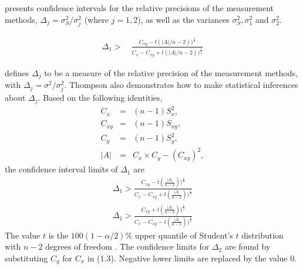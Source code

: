 \documentclass[12pt, a4paper]{report}
\theoremstyle{plain}
\theoremstyle{definition}
\theoremstyle{remark}
\begin{document}
\citet{Thompson} presents confidence intervals for the relative
precisions of the measurement methods, $\Delta_{j}=
\sigma^2_{S}/\sigma^2_{j}$ (where $j=1,2$), as well as the
variances $\sigma^{2}_{S}, \sigma^{2}_{1}$ and $\sigma^{2}_{2}$.

\begin{eqnarray}
\Delta_{1} >\quad \frac{C_{xy}-
	t(|A|/n-2))^{\frac{1}{2}}}{C_{x}-C_{xy}+
	t(|A|/n-2))^{\frac{1}{2}}}
\end{eqnarray}

\citet{Thompson} defines $\Delta_{j}$ to be a measure of the
relative precision of the measurement methods, with $\Delta_{j}=
\sigma^2/\sigma^2_{j}$. Thompson also demonstrates how to make statistical inferences about $\Delta_{j}$.
Based on the following identities,
\begin{eqnarray*}
	C_{x}&=&(n-1)S^2_{x},\nonumber\\
	C_{xy}&=&(n-1)S_{xy},\nonumber\\
	C_{y}&=&(n-1)S^2_{y},\nonumber\\
	|A| &=& C_{x}\times C_{y} - (C_{xy})^2,\nonumber
\end{eqnarray*}
\noindent the confidence interval limits of $\Delta_{1}$ are
\begin{eqnarray}
\Delta_{1} > \frac{C_{xy}-
	t(\frac{|A|}{n-2}))^{\frac{1}{2}}}{C_{x}-C_{xy}+
	t(\frac{|A|}{n-2}))^{\frac{1}{2}}} \\
\Delta_{1} > \frac{C_{xy}+
	t(\frac{|A|}{n-2}))^{\frac{1}{2}}}{C_{x}-C_{xy}-
	t(\frac{|A|}{n-1}))^{\frac{1}{2}}} \nonumber
\end{eqnarray}
The value $t$ is the $100(1-\alpha/2)\%$ upper quantile of
Student's $t$ distribution with $n-2$ degrees of freedom
\citep{Kinsella}. The confidence limits for $\Delta_{2}$ are found by substituting $C_{y}$ for $C_{x}$ in (1.3).
Negative lower limits are replaced by the value $0$.


\end{document}
